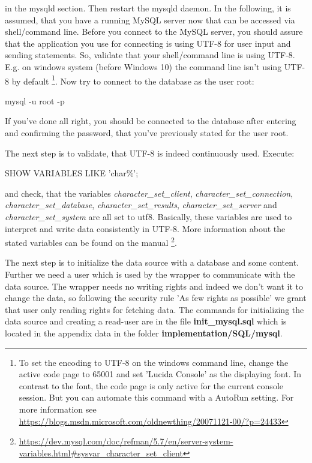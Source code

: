in the mysqld section. Then restart the mysqld daemon. In the following, it is assumed, that you have a running MySQL server now that can be accessed via shell/command line. Before you connect to the MySQL server, you should assure that the application you use for connecting is using UTF-8 for user input and sending statements. So, validate that your shell/command line is using UTF-8. E.g. on windows system (before Windows 10) the command line isn't using UTF-8 by default
\footnote{To set the encoding to UTF-8 on the windows command line, change the active code page to 65001 and set 'Lucida Console' as the displaying font. In contrast to the font, the code page is only active for the current console session. But you can automate this command with a AutoRun setting. For more information see \url{https://blogs.msdn.microsoft.com/oldnewthing/20071121-00/?p=24433}}.  
Now try to connect to the database as the user root:

\begin{codebox}
	mysql -u root -p 
\end{codebox}

If you've done all right, you should be connected to the database after entering and confirming the password, that you've previously stated for the user root.

The next step is to validate, that UTF-8 is indeed continuously used. Execute:

\begin{codebox}
	SHOW VARIABLES LIKE 'char\%';
\end{codebox}

and check, that the variables \emph{character\_set\_client}, \emph{character\_set\_connection}, \emph{character\_set\_database}, \emph{character\_set\_results}, \emph{character\_set\_server} and \emph{character\_set\_system} are all set to utf8.
Basically, these variables are used to interpret and write data consistently in UTF-8. More information about the stated variables can be found on the manual
\footnote{\url{https://dev.mysql.com/doc/refman/5.7/en/server-system-variables.html\#sysvar_character_set_client}}.

The next step is to initialize the data source with a database and some content. Further we need a user which is used by the wrapper to communicate with the data source. The wrapper needs no writing rights and indeed we don't want it to change the data, so following the security rule 'As few rights as possible' we grant that user only reading rights for fetching data. The commands for initializing the data source and creating a read-user are in the file \textbf{init\_mysql.sql} which is located in the appendix data in the folder \textbf{implementation/SQL/mysql}.

